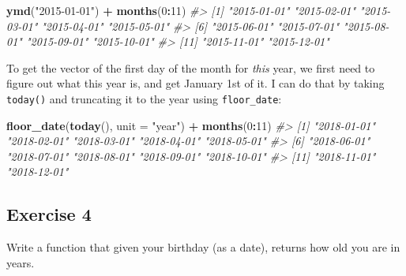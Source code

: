 \documentclass[]{book}
\newenvironment{Shaded}{\begin{snugshade}}{\end{snugshade}}
\newcommand{\CommentTok}[1]{\textcolor[rgb]{0.56,0.35,0.01}{\textit{#1}}}
\newcommand{\ControlFlowTok}[1]{\textcolor[rgb]{0.13,0.29,0.53}{\textbf{#1}}}
\newcommand{\DataTypeTok}[1]{\textcolor[rgb]{0.13,0.29,0.53}{#1}}
\newcommand{\DecValTok}[1]{\textcolor[rgb]{0.00,0.00,0.81}{#1}}
\newcommand{\KeywordTok}[1]{\textcolor[rgb]{0.13,0.29,0.53}{\textbf{#1}}}
\newcommand{\NormalTok}[1]{#1}
\newcommand{\OperatorTok}[1]{\textcolor[rgb]{0.81,0.36,0.00}{\textbf{#1}}}
\newcommand{\StringTok}[1]{\textcolor[rgb]{0.31,0.60,0.02}{#1}}
\theoremstyle{plain}
\theoremstyle{remark}
\theoremstyle{definition}
\theoremstyle{definition}
\theoremstyle{definition}
\theoremstyle{remark}
\begin{document}
\begin{Shaded}
\begin{Highlighting}[]
\KeywordTok{ymd}\NormalTok{(}\StringTok{"2015-01-01"}\NormalTok{) }\OperatorTok{+}\StringTok{ }\KeywordTok{months}\NormalTok{(}\DecValTok{0}\OperatorTok{:}\DecValTok{11}\NormalTok{)}
\CommentTok{#>  [1] "2015-01-01" "2015-02-01" "2015-03-01" "2015-04-01" "2015-05-01"}
\CommentTok{#>  [6] "2015-06-01" "2015-07-01" "2015-08-01" "2015-09-01" "2015-10-01"}
\CommentTok{#> [11] "2015-11-01" "2015-12-01"}
\end{Highlighting}
\end{Shaded}

To get the vector of the first day of the month for \emph{this} year, we
first need to figure out what this year is, and get January 1st of it. I
can do that by taking \texttt{today()} and truncating it to the year
using \texttt{floor\_date}:

\begin{Shaded}
\begin{Highlighting}[]
\KeywordTok{floor_date}\NormalTok{(}\KeywordTok{today}\NormalTok{(), }\DataTypeTok{unit =} \StringTok{"year"}\NormalTok{) }\OperatorTok{+}\StringTok{ }\KeywordTok{months}\NormalTok{(}\DecValTok{0}\OperatorTok{:}\DecValTok{11}\NormalTok{)}
\CommentTok{#>  [1] "2018-01-01" "2018-02-01" "2018-03-01" "2018-04-01" "2018-05-01"}
\CommentTok{#>  [6] "2018-06-01" "2018-07-01" "2018-08-01" "2018-09-01" "2018-10-01"}
\CommentTok{#> [11] "2018-11-01" "2018-12-01"}
\end{Highlighting}
\end{Shaded}

\hypertarget{exercise-4-25}{%
\subsection{Exercise 4}\label{exercise-4-25}}

Write a function that given your birthday (as a date), returns how old
you are in years.

\begin{Shaded}
\end{Shaded}
\end{document}
